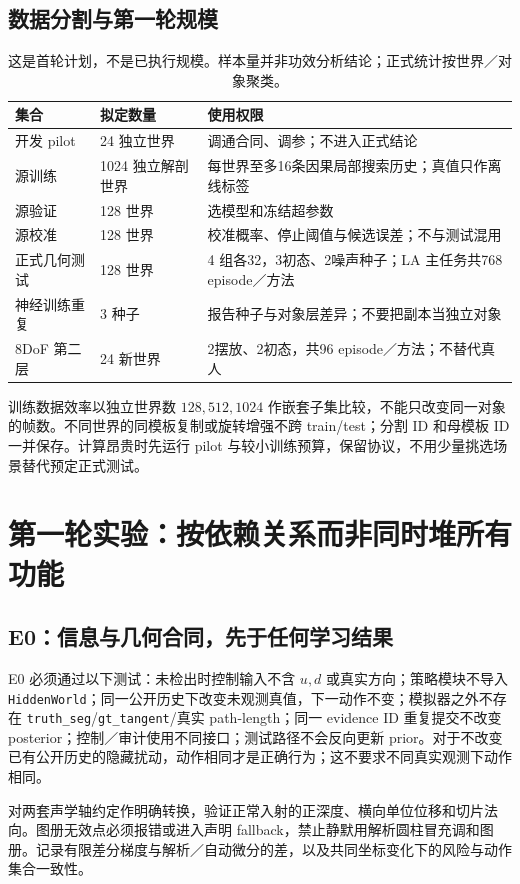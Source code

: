 \documentclass[UTF8,fontset=fandol,11pt,a4paper]{ctexart}
\theoremstyle{plain}
\theoremstyle{definition}
\theoremstyle{remark}
\numberwithin{equation}{section}
\newcommand{\code}[1]{\begingroup\small\nolinkurl{#1}\endgroup}
\begin{document}
\subsection{数据分割与第一轮规模}
\begin{table}[htbp]\centering\small
\begin{tabularx}{\linewidth}{P{35mm}P{30mm}Y}\toprule
集合 & 拟定数量 & 使用权限\\\midrule
开发 pilot & 24 独立世界 & 调通合同、调参；不进入正式结论\\
源训练 & 1024 独立解剖世界 & 每世界至多16条因果局部搜索历史；真值只作离线标签\\
源验证 & 128 世界 & 选模型和冻结超参数\\
源校准 & 128 世界 & 校准概率、停止阈值与候选误差；不与测试混用\\
正式几何测试 & 128 世界 & 4 组各32，3初态、2噪声种子；LA 主任务共768 episode／方法\\
神经训练重复 & 3 种子 & 报告种子与对象层差异；不要把副本当独立对象\\
8DoF 第二层 & 24 新世界 & 2摆放、2初态，共96 episode／方法；不替代真人\\\bottomrule
\end{tabularx}
\caption{这是首轮计划，不是已执行规模。样本量并非功效分析结论；正式统计按世界／对象聚类。}
\end{table}
训练数据效率以独立世界数 $128,512,1024$ 作嵌套子集比较，不能只改变同一对象的帧数。不同世界的同模板复制或旋转增强不跨 train/test；分割 ID 和母模板 ID 一并保存。计算昂贵时先运行 pilot 与较小训练预算，保留协议，不用少量挑选场景替代预定正式测试。

\section{第一轮实验：按依赖关系而非同时堆所有功能}
\label{sec:experiments}
\subsection{E0：信息与几何合同，先于任何学习结果}
E0 必须通过以下测试：未检出时控制输入不含 $u,d$ 或真实方向；策略模块不导入 \code{HiddenWorld}；同一公开历史下改变未观测真值，下一动作不变；模拟器之外不存在 \code{truth_seg}/\code{gt_tangent}/真实 path-length；同一 evidence ID 重复提交不改变 posterior；控制／审计使用不同接口；测试路径不会反向更新 prior。对于不改变已有公开历史的隐藏扰动，动作相同才是正确行为；这不要求不同真实观测下动作相同。

对两套声学轴约定作明确转换，验证正常入射的正深度、横向单位位移和切片法向。图册无效点必须报错或进入声明 fallback，禁止静默用解析圆柱冒充调和图册。记录有限差分梯度与解析／自动微分的差，以及共同坐标变化下的风险与动作集合一致性。
\end{document}
